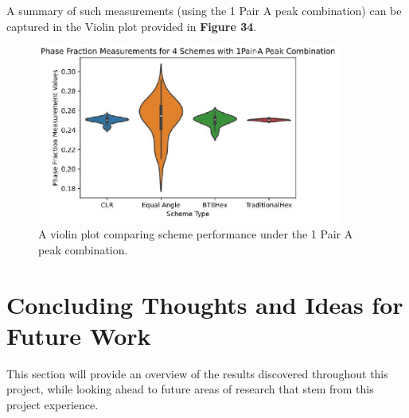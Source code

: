 \documentclass[10pt]{article}
\begin{document}
A summary of such measurements (using the 1 Pair A peak combination) can be captured in the Violin plot provided in \textbf{Figure 34}.
\begin{figure}[h]
    \centering
    \includegraphics[width=10cm]{fig34}
    \caption{\label{tab1}A violin plot comparing scheme performance under the 1 Pair A peak combination.} 
    \end{figure}

\section{Concluding Thoughts and Ideas for Future Work}
This section will provide an overview of the results discovered throughout this project, while looking ahead to future areas of research that
stem from this project experience.
\end{document}
